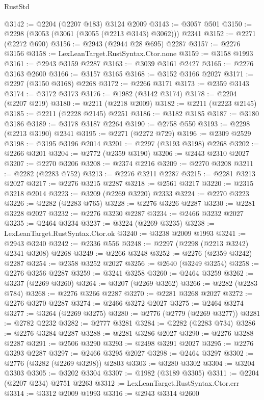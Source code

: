 \begin{lexlean}{RustStd}
\begin{coremodule}
{\begin{coremodule}
{{{{{{{{{{{{{{{{{{{{{{{{{{{{{{{{{{{{{{{{{{{{{{{{{{{{{{@3142 := @2204 (@2207 @183) @3124 @2009
@3143 := @3057 @501
@3150 := @2298 (@3053 (@3061 (@3055 (@2213 @3143) @3062))) @2341
@3152 := @2271 (@2272 @690)
@3156 := @2943 (@2944 @28 @695) @2287
@3157 := @2276 @3156
@3158 := LexLeanTarget.RustSyntax.Ctor.none
@3159 := @3158 @1993
@3161 := @2943 @3159 @2287
@3163 := @3039 @3161 @2427
@3165 := @2276 @3163 @2600
@3166 := @3157 @3165
@3168 := @3152 @3166 @2027
@3171 := @2297 (@3150 @3168) @2268
@3172 := @2266 @3171
@3173 := @2359 @3143
@3174 := @3172 @3173
@3176 := @1982 (@3142 @3174)
@3178 := @2204 (@2207 @219)
@3180 := @2211 (@2218 @2009)
@3182 := @2211 (@2223 @2145)
@3185 := @2211 (@2228 @2145) @2251
@3186 := @3182 @3185
@3187 := @3180 @3186
@3189 := @3178 @3187 @2264
@3190 := @2758 @550
@3193 := @2298 (@2213 @3190) @2341
@3195 := @2271 (@2272 @729)
@3196 := @2309 @2529
@3198 := @3195 @3196 @2014
@3201 := @2297 (@3193 @3198) @2268
@3202 := @2266 @3201
@3204 := @2772 (@2359 @3190)
@3206 := @2443 @2310 @2027
@3207 := @2270 @3206
@3208 := @2374 @2216
@3209 := @2270 @3208
@3211 := @2282 (@2283 @752)
@3213 := @2276 @3211 @2287
@3215 := @2281 @3213 @2027
@3217 := @2276 @3215 @2287
@3218 := @2561 @3217
@3220 := @2315 @3218 @2014
@3223 := @3209 (@2269 @3220) @2333
@3224 := @2270 @3223
@3226 := @2282 (@2283 @765)
@3228 := @2276 @3226 @2287
@3230 := @2281 @3228 @2027
@3232 := @2276 @3230 @2287
@3234 := @2466 @3232 @2027
@3235 := @2464 @3234
@3237 := @3224 (@2269 @3235)
@3238 := LexLeanTarget.RustSyntax.Ctor.ok
@3240 := @3238 @2009 @1993
@3241 := @2943 @3240
@3242 := @2336 @556
@3248 := @2297 (@2298 (@2213 @3242) @2341 @3208) @2268
@3249 := @2266 @3248
@3252 := @2276 (@2359 @3242) @2287
@3254 := @2358 @3252 @2027
@3256 := @2640 (@3249 @3254)
@3258 := @2276 @3256 @2287
@3259 := @3241 @3258
@3260 := @2464 @3259
@3262 := @3237 (@2269 @3260)
@3264 := @3207 (@2269 @3262)
@3266 := @2282 (@2283 @784)
@3268 := @2276 @3266 @2287
@3270 := @2281 @3268 @2027
@3272 := @2276 @3270 @2287
@3274 := @2466 @3272 @2027
@3275 := @2464 @3274
@3277 := @3264 (@2269 @3275)
@3280 := @2776 (@2779 (@2269 @3277))
@3281 := @2782 @2232
@3282 := @2777 @3281
@3284 := @2282 (@2283 @734)
@3286 := @2276 @3284 @2287
@3288 := @2281 @3286 @2027
@3290 := @2276 @3288 @2287
@3291 := @2506 @3290
@3293 := @2498 @3291 @2027
@3295 := @2276 @3293 @2287
@3297 := @2466 @3295 @2027
@3298 := @2464 @3297
@3302 := @2776 (@3282 (@2269 @3298)) @2803
@3303 := @3280 @3302
@3304 := @3204 @3303
@3305 := @3202 @3304
@3307 := @1982 (@3189 @3305)
@3311 := @2204 (@2207 @234) @2751 @2263
@3312 := LexLeanTarget.RustSyntax.Ctor.err
@3314 := @3312 @2009 @1993
@3316 := @2943 @3314 @2600
}}}}}}}}}}}}}}}}}}}}}}}}}}}}}}}}}}}}}}}}}}}}}}}}}}}}}}
\end{coremodule}}
\end{coremodule}
\end{lexlean}
